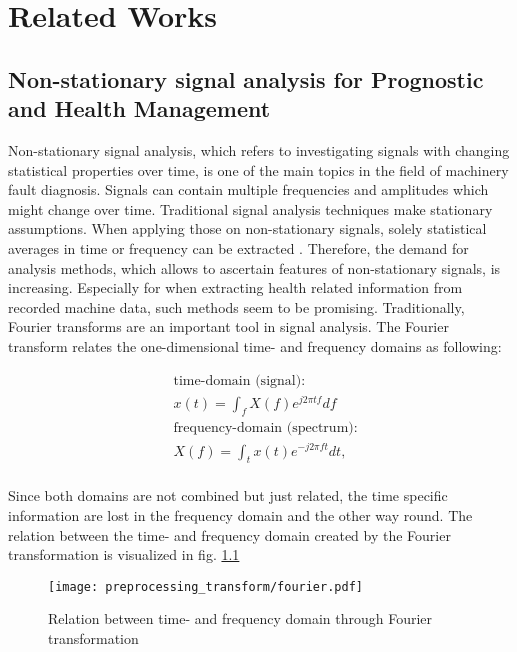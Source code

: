 
\chapter{Related Works}\label{chapter:related_works}
\begin{comment}
In general, the methods applied can be categorized into physics-based, statistics-based, artificial intelligence (AI) and hybrid approaches.

\end{comment}


\section{Non-stationary signal analysis for Prognostic and Health Management}
Non-stationary signal analysis, which refers to investigating signals with changing statistical properties over time, is one of the main topics in the field of machinery fault diagnosis. Signals can contain multiple frequencies and amplitudes which might change over time. Traditional signal analysis techniques make stationary assumptions. When applying those on non-stationary signals, solely statistical averages in time or frequency can be extracted \cite{FENG2013}. Therefore, the demand for analysis methods, which allows to ascertain features of non-stationary signals, is increasing. Especially for when extracting health related information from recorded machine data, such methods seem to be promising. Traditionally, Fourier transforms are an important tool in signal analysis. The Fourier transform relates the one-dimensional time- and frequency domains as following:

\begin{equation}
    \begin{aligned}
        & \mbox{time-domain (signal):} \\
        & x(t) = \int_{f} X(f) e^{j 2 \pi t f} df \\
        & \mbox{frequency-domain (spectrum):} \\
        & X(f) = \int_{t} x(t) e^{- j 2 \pi f t} dt, \\
    \end{aligned}
\end{equation}

Since both domains are not combined but just related, the time specific information are lost in the frequency domain and the other way round. The relation between the time- and frequency domain created by the Fourier transformation is visualized in fig. \ref{fig:fourier} 
\begin{figure}[H]
  \centering
  \texttt{[image: preprocessing\_transform/fourier.pdf]}
  \caption{Relation between time- and frequency domain through Fourier transformation}
  \label{fig:fourier}
\end{figure}

